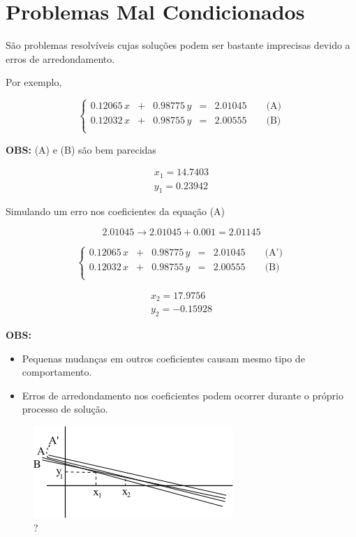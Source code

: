 \section{Problemas Mal Condicionados}

São problemas resolvíveis cujas soluções podem ser bastante imprecisas devido a erros de arredondamento.

Por exemplo,

\[
 \left\{
 \begin{array}{rrrrl}
  0.12065\,x & + & 0.98775\,y & = & 2.01045 \qquad \mbox{(A)} \\
  0.12032\,x & + & 0.98755\,y & = & 2.00555 \qquad \mbox{(B)} \\
 \end{array}
 \right.
\]

\textbf{OBS:} (A) e (B) são bem parecidas

\[
\begin{array}{l}
 x_1 = 14.7403 \\
 y_1 = 0.23942
\end{array}
\]

Simulando um erro nos coeficientes da equação (A)

\[
 2.01045 \rightarrow 2.01045 + 0.001 = 2.01145
\]

\[
 \left\{
 \begin{array}{rrrrl}
  0.12065\,x & + & 0.98775\,y & = & 2.01045 \qquad \mbox{(A')} \\
  0.12032\,x & + & 0.98755\,y & = & 2.00555 \qquad \mbox{(B)} \\
 \end{array}
 \right.
\]

\[
\begin{array}{l}
 x_2 = 17.9756 \\
 y_2 = -0.15928
\end{array}
\]

\textbf{OBS:}

\begin{itemize}

\item Pequenas mudanças em outros coeficientes causam mesmo tipo de comportamento.

\item Erros de arredondamento nos coeficientes podem ocorrer durante o próprio processo de solução.

\end{itemize}

\begin{figure}[htb]
 \centering
 \includegraphics[scale=0.8]{capitulos/capitulo4/figuras/prob_mal_cond1.png}
 \caption{?}
 \label{fig:prob_mal_cond1}
\end{figure}

